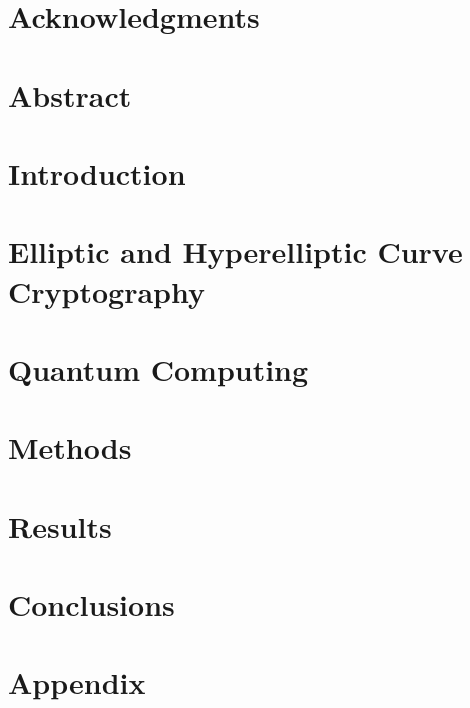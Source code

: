 \documentclass[10pt]{article}
\begin{document}

\restoregeometry

\section{Acknowledgments}

\pagebreak

\setcounter{tocdepth}{5}
\tableofcontents
\pagebreak

\listoffigures
\listoftables
\pagebreak

\justify

\section*{Abstract}

\pagebreak

\section{Introduction}


\section{Elliptic and Hyperelliptic Curve Cryptography}


\section{Quantum Computing}


\section{Methods}


\section{Results}


\section{Conclusions}


\pagebreak
\section{Appendix}


\pagebreak


\end{document}
